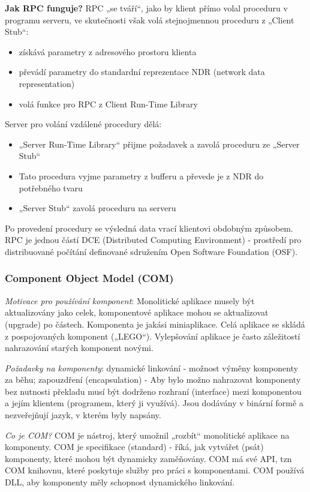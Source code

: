 \textbf{Jak RPC funguje?} RPC „se tváří“, jako by klient přímo volal proceduru v programu serveru, ve skutečnosti však volá stejnojmennou proceduru z „Client Stub“:
\begin{itemize}
\item získává parametry z adresového prostoru klienta
\item převádí parametry do standardní reprezentace NDR (network data representation)
\item volá funkce pro RPC z Client Run-Time Library
\end{itemize}
Server pro volání vzdálené procedury dělá:
\begin{itemize}
\item „Server Run-Time Library“ přijme požadavek a zavolá proceduru ze „Server Stub“
\item Tato procedura vyjme parametry z bufferu a převede je z NDR do potřebného tvaru
\item „Server Stub“ zavolá proceduru na serveru
\end{itemize}
Po provedení procedury se výsledná data vrací klientovi obdobným způsobem. RPC je jednou částí DCE (Distributed Computing Environment) - prostředí pro distribuované počítání definované sdružením Open Software Foundation (OSF).

\subsubsection*{Component Object Model (COM)}
\textit{Motivace pro používání komponent}: Monolitické aplikace musely být aktualizovány jako celek, komponentové aplikace mohou se aktualizovat (upgrade) po částech. Komponenta je jakási miniaplikace. Celá aplikace se skládá z pospojovaných komponent („LEGO“). Vylepšování aplikace je často záležitostí nahrazování starých komponent novými.

\textit{Požadavky na komponenty}: dynamické linkování - možnost výměny komponenty za běhu; zapouzdření (encapsulation) - Aby bylo možno nahrazovat komponenty bez nutnosti překladu musí být dodrženo rozhraní (interface) mezi komponentou a jejím klientem (programem, který ji využívá). Jsou dodávány v binární formě a nezveřejňují jazyk, v kterém byly napsány.

\textit{Co je COM?} COM je nástroj, který umožnil „rozbít“ monolitické aplikace na komponenty. COM je specifikace (standard) - říká, jak vytvářet (psát) komponenty, které mohou být dynamicky zaměňovány. COM má své API, tzn COM knihovnu, které poskytuje služby pro práci s komponentami. COM používá DLL, aby komponenty měly schopnost dynamického linkování.

